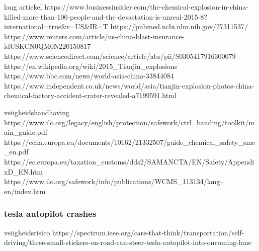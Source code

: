 lang artiekel
https://www.businessinsider.com/the-chemical-explosion-in-china-killed-more-than-100-people-and-the-devastation-is-unreal-2015-8?international=true&r=US&IR=T
https://pubmed.ncbi.nlm.nih.gov/27311537/
https://www.reuters.com/article/us-china-blast-insurance-idUSKCN0QM0N220150817
https://www.sciencedirect.com/science/article/abs/pii/S0305417916300079
https://en.wikipedia.org/wiki/2015_Tianjin_explosions
https://www.bbc.com/news/world-asia-china-33844084
https://www.independent.co.uk/news/world/asia/tianjin-explosion-photos-china-chemical-factory-accident-crater-revealed-a7199591.html

veiigheidshandhaving
https://www.ilo.org/legacy/english/protection/safework/ctrl_banding/toolkit/main_guide.pdf
https://echa.europa.eu/documents/10162/21332507/guide_chemical_safety_sme_en.pdf
https://ec.europa.eu/taxation_customs/dds2/SAMANCTA/EN/Safety/AppendixD_EN.htm
https://www.ilo.org/safework/info/publications/WCMS_113134/lang--en/index.htm




\subsubsection{tesla autopilot crashes}


veiigheidsrisico
https://spectrum.ieee.org/cars-that-think/transportation/self-driving/three-small-stickers-on-road-can-steer-tesla-autopilot-into-oncoming-lane

